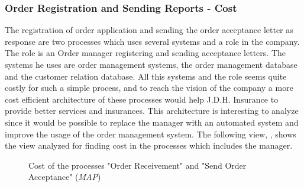 \subsubsection{Order Registration and Sending Reports - Cost}
\label{sec:order_analysis}
The registration of order application and sending the order acceptance letter as response are two processes which uses several systems and a role in the company. The role is an Order manager registering and sending acceptance letters. The systems he uses are order management systems, the order management database and the customer relation database. All this systems and the role seems quite costly for such a simple process, and to reach the vision of the company a more cost efficient architecture of these processes would help J.D.H. Insurance to provide better services and insurances. This architecture is interesting to analyze since it would be possible to replace the manager with an automated system and improve the usage of the order management system. The following view, , shows the view analyzed for finding cost in the processes which includes the manager.
\begin{center}
	\begin{figure}[H]
		\centering
		\setlength\fboxsep{7pt}
		\setlength\fboxrule{0.5pt}
		\caption{Cost of the processes "Order Receivement" and "Send Order Acceptance" (\emph{MAP})}
		\label{fig:map_order_cost}
	\end{figure}
\end{center}

